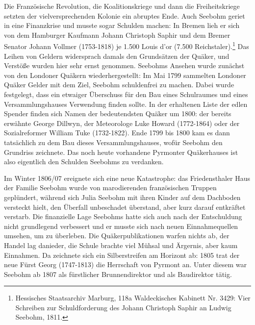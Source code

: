 \medskip

Die Französische Revolution, die Koalitionskriege und dann die Freiheitskriege
setzten der vielversprechenden Kolonie ein abruptes Ende. Auch Seebohm geriet in
eine Finanzkrise und musste sogar Schulden machen: In Bremen lieh er sich von
dem Hamburger Kaufmann Johann Christoph Saphir und dem Bremer Senator Johann
Vollmer (1753-1818) je 1.500 Louis d’or (7.500 Reichstaler).\footnote{Hessisches
Staatsarchiv Marburg, 118a Waldeckisches Kabinett Nr. 3429: Vier
Schreiben zur Schuldforderung des Johann Christoph Saphir an Ludwig Seebohm,
1811.} Das Leihen von
Geldern widersprach damals den Grundsätzen der Quäker, und Verstöße wurden hier
sehr ernst genommen. Seebohms Ansehen wurde zunächst von den Londoner Quäkern
wiederhergestellt: Im Mai 1799 sammelten Londoner Quäker Gelder mit dem Ziel,
Seebohm schuldenfrei zu machen. Dabei wurde festgelegt, dass ein etwaiger
Überschuss für den Bau eines Schulraumes und eines Versammlungshauses Verwendung
finden sollte. In der erhaltenen Liste der edlen Spender finden sich Namen der
bedeutendsten Quäker um 1800: der bereits erwähnte George Dillwyn, der
Meteorologe Luke Howard (1772-1864) oder der Sozialreformer William Tuke
(1732-1822). Ende 1799 bis 1800 kam es dann tatsächlich zu dem Bau dieses
Versammlungshauses, wofür Seebohm den Grundriss zeichnete. Das noch heute
vorhandene Pyrmonter Quäkerhauses ist also eigentlich den Schulden Seebohms zu
verdanken.

\medskip

Im Winter 1806/07 ereignete sich eine neue Katastrophe: das Friedensthaler Haus
der Familie Seebohm wurde von marodierenden französischen Truppen geplündert,
während sich Julia Seebohm mit ihren Kinder auf dem Dachboden versteckt hielt,
den Überfall unbeschadet überstand, aber kurz darauf entkräftet verstarb. Die
finanzielle Lage Seebohms hatte sich auch nach der Entschuldung nicht
grundlegend verbessert und er musste sich nach neuen Einnahmequellen umsehen, um
zu überleben. Die Quäkerpublikationen warfen nichts ab, der Handel lag danieder,
die Schule brachte viel Mühsal und Ärgernis, aber kaum Einnahmen. Da zeichnete
sich ein Silberstreifen am Horizont ab: 1805 trat der neue Fürst Georg
(1747-1813) die Herrschaft von Pyrmont an. Unter diesem war Seebohm ab 1807 als
fürstlicher Brunnendirektor und als Baudirektor tätig.

\medskip

